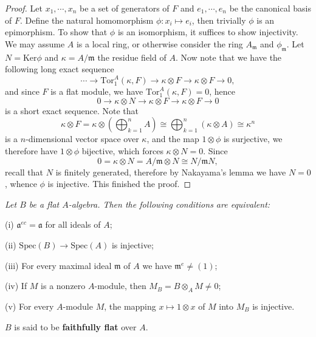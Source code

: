 \begin{proof}
Let $x_1,\cdots,x_n$ be a set of generators of $F$ and $e_1,\cdots,e_n$ be the canonical basis of $F$. Define the natural homomorphism $\phi:x_i\mapsto e_i$, then trivially $\phi$ is an epimorphism. To show that $\phi$ is an isomorphism, it suffices to show injectivity. We may assume $A$ is a local ring, or otherwise consider the ring $A_\mathfrak{m}$ and $\phi_\mathfrak{m}$. Let $N=\mathrm{Ker}\phi$ and $\kappa=A/\mathfrak{m}$ the residue field of $A$. Now note that we have the following long exact sequence 
$$
\cdots \longrightarrow \mathrm{Tor}_{1}^{A}\left( \kappa ,F \right) \longrightarrow \kappa \otimes F\longrightarrow \kappa \otimes F\longrightarrow 0,
$$
and since $F$ is a flat module, we have $\mathrm{Tor}_1^A(\kappa,F)=0$, hence 
$$
0\longrightarrow \kappa \otimes N\longrightarrow \kappa \otimes F\longrightarrow \kappa \otimes F\longrightarrow 0
$$
is a short exact sequence. Note that 
$$
\kappa \otimes F=\kappa \otimes \left( \bigoplus_{k=1}^n{A} \right) \cong \bigoplus_{k=1}^n{\left( \kappa \otimes A \right)}\cong \kappa ^n
$$
is a $n$-dimensional vector space over $\kappa$, and the map $1\otimes\phi$ is surjective, we therefore have $1\otimes\phi$ bijective, which forces $\kappa\otimes N=0$. Since 
$$
0=\kappa \otimes N=A/\mathfrak{m} \otimes N\cong N/\mathfrak{m} N,
$$
recall that $N$ is finitely generated, therefore by Nakayama's lemma we have $N=0$, whence $\phi$ is injective. This finished the proof.
\end{proof}
\begin{problem}\em
Let $B$ be a flat $A$-algebra. Then the following conditions are equivalent: \par
(i) $\mathfrak{a}^{ec}=\mathfrak{a}$ for all ideals of $A$;\par
(ii) $\mathrm{Spec}(B)\to\mathrm{Spec}(A)$ is injective;\par
(iii) For every maximal ideal $\mathfrak{m}$ of $A$ we have $\mathfrak{m}^e\ne (1)$;\par
(iv) If $M$ is a nonzero $A$-module, then $M_B=B\otimes_AM\ne 0$;\par
(v) For every $A$-module $M$, the mapping $x\mapsto 1\otimes x$ of $M$ into $M_B$ is injective.\par
$B$ is said to be \textbf{faithfully flat} over $A$.
\end{problem}
